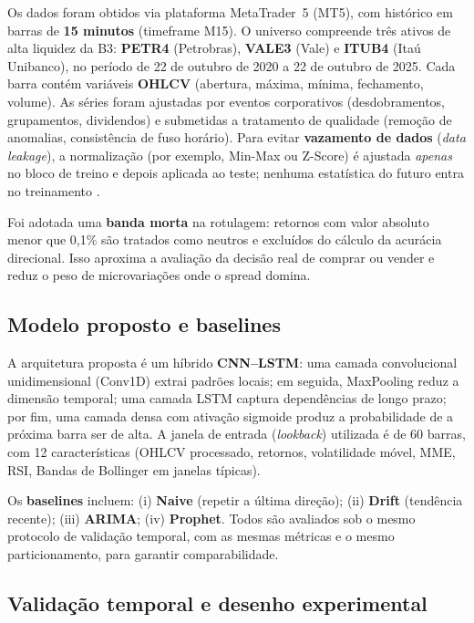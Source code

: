Os dados foram obtidos via plataforma MetaTrader~5 (MT5), com histórico em barras de \textbf{15 minutos} (timeframe M15). O universo compreende três ativos de alta liquidez da B3: \textbf{PETR4} (Petrobras), \textbf{VALE3} (Vale) e \textbf{ITUB4} (Itaú Unibanco), no período de 22 de outubro de 2020 a 22 de outubro de 2025. Cada barra contém variáveis \textbf{OHLCV} (abertura, máxima, mínima, fechamento, volume). As séries foram ajustadas por eventos corporativos (desdobramentos, grupamentos, dividendos) e submetidas a tratamento de qualidade (remoção de anomalias, consistência de fuso horário). Para evitar \textbf{vazamento de dados} (\emph{data leakage}), a normalização (por exemplo, Min-Max ou Z-Score) é ajustada \emph{apenas} no bloco de treino e depois aplicada ao teste; nenhuma estatística do futuro entra no treinamento \cite{prado2018,bergmeir2012}.

Foi adotada uma \textbf{banda morta} na rotulagem: retornos com valor absoluto menor que 0,1\% são tratados como neutros e excluídos do cálculo da acurácia direcional. Isso aproxima a avaliação da decisão real de comprar ou vender e reduz o peso de microvariações onde o spread domina.

\subsection{Modelo proposto e baselines}

A arquitetura proposta é um híbrido \textbf{CNN--LSTM}: uma camada convolucional unidimensional (Conv1D) extrai padrões locais; em seguida, MaxPooling reduz a dimensão temporal; uma camada LSTM captura dependências de longo prazo; por fim, uma camada densa com ativação sigmoide produz a probabilidade de a próxima barra ser de alta. A janela de entrada (\emph{lookback}) utilizada é de 60 barras, com 12 características (OHLCV processado, retornos, volatilidade móvel, MME, RSI, Bandas de Bollinger em janelas típicas).

Os \textbf{baselines} incluem: (i) \textbf{Naive} (repetir a última direção); (ii) \textbf{Drift} (tendência recente); (iii) \textbf{ARIMA}; (iv) \textbf{Prophet}. Todos são avaliados sob o mesmo protocolo de validação temporal, com as mesmas métricas e o mesmo particionamento, para garantir comparabilidade.

\subsection{Validação temporal e desenho experimental}

